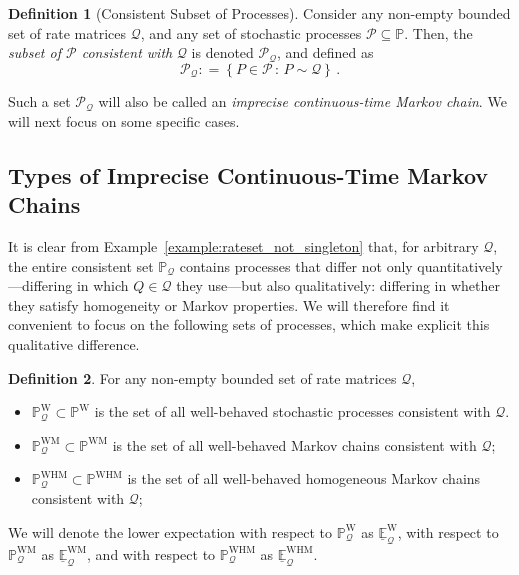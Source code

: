 \documentclass[10pt,a4paper]{paper}
\theoremstyle{definition}
\newtheorem{definition}{Definition}
\newcommand{\processes}{\mathbb{P}}
\newcommand{\wprocesses}{\processes^{\mathrm{W}}}
\newcommand{\wmprocesses}{\processes^{\mathrm{WM}}}
\newcommand{\whmprocesses}{\processes^{\mathrm{WHM}}}
\newcommand{\rateset}{\mathcal{Q}}
\newcommand{\coloneqq}{:\!=}
\begin{document}
\begin{definition}[Consistent Subset of Processes]\label{def:consistent_process_set}
Consider any non-empty bounded set of rate matrices $\rateset$, and any set of stochastic processes $\mathcal{P}\subseteq\processes$. Then, the \emph{subset of $\mathcal{P}$ consistent with} $\rateset$ is denoted $\mathcal{P}_\rateset$, and defined as
\begin{equation*}
\mathcal{P}_{\rateset} \coloneqq \left\{P\in\mathcal{P}\,:\,P\sim\rateset\right\}\,.
\end{equation*}
\end{definition}
Such a set $\mathcal{P}_\rateset$ will also be called an \emph{imprecise continuous-time Markov chain}. We will next focus on some specific cases.

\subsection{Types of Imprecise Continuous-Time Markov Chains}

It is clear from Example~\ref{example:rateset_not_singleton} that, for arbitrary $\rateset$, the entire consistent set $\processes_\rateset$ contains processes that differ not only quantitatively---differing in which $Q\in\rateset$ they use---but also qualitatively: differing in whether they satisfy homogeneity or Markov properties. We will therefore find it convenient to focus on the following sets of processes, which make explicit this qualitative difference.

\begin{definition}\label{def:process_sets}
For any non-empty bounded set of rate matrices $\rateset$,
\begin{itemize}
\item $\wprocesses_\rateset\subset\wprocesses$ is the set of all well-behaved stochastic processes consistent with $\rateset$.
\item $\wmprocesses_\rateset\subset\wmprocesses$ is the set of all well-behaved Markov chains consistent with $\rateset$;
\item $\whmprocesses_\rateset\subset\whmprocesses$ is the set of all well-behaved homogeneous Markov chains consistent with $\rateset$;
\end{itemize}
We will denote the lower expectation with respect to $\wprocesses_\rateset$ as $\underline{\mathbb{E}}_\rateset^{\mathrm{W}}$, with respect to $\wmprocesses_\rateset$ as $\underline{\mathbb{E}}_\rateset^{\mathrm{WM}}$, and with respect to  $\whmprocesses_\rateset$ as $\underline{\mathbb{E}}_\rateset^{\mathrm{WHM}}$.
\end{definition}
\end{document}
